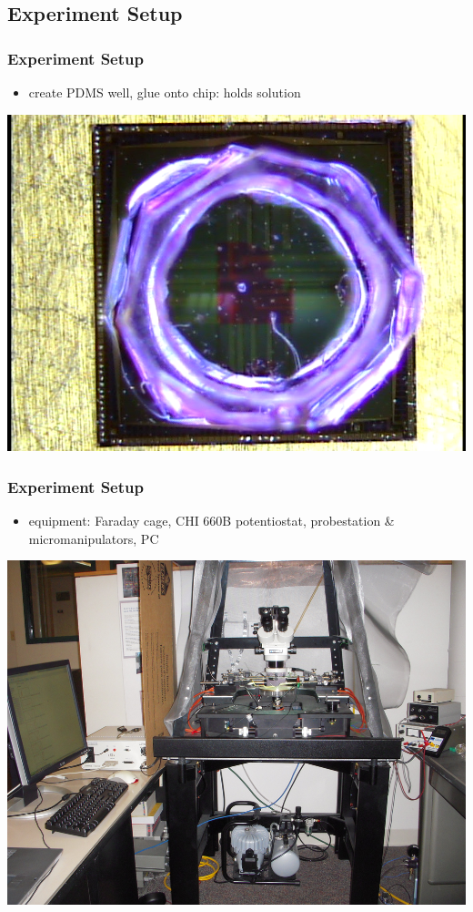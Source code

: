 \documentclass[10pt]{beamer}
\begin{document}
\subsection{Experiment Setup}
\begin{frame}
	\frametitle{Experiment Setup}
	\begin{itemize}
		\item create PDMS well, glue onto chip: holds solution
	\end{itemize}
	\includegraphics[width=0.5\linewidth]{figures/chip-top.png}
\end{frame}

\begin{frame}
	\frametitle{Experiment Setup}
	\begin{itemize}
		\item equipment: Faraday cage, CHI 660B potentiostat, probestation \& micromanipulators, PC
	\end{itemize}
	\includegraphics[width=0.5\linewidth]{figures/probestation.png}
\end{frame}
\end{document}
